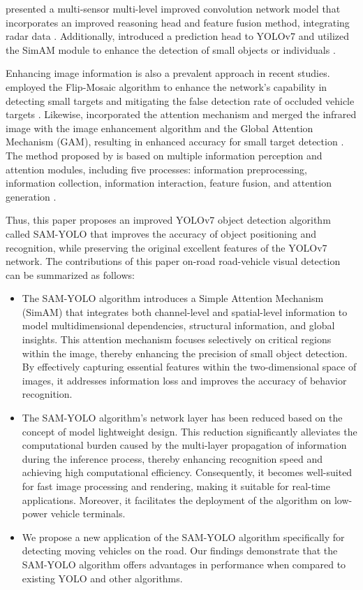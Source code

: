 \documentclass[aic]{iosart2x}
\begin{document}
\citeauthor{Zhu_2020} presented a multi-sensor multi-level improved convolution network model that incorporates an improved reasoning head and feature fusion method, integrating radar data \cite{Zhu_2020}. Additionally, \citeauthor{Zhao_2023} introduced a prediction head to YOLOv7 and utilized the SimAM module to enhance the detection of small objects or individuals \cite{Zhao_2023}.

Enhancing image information is also a prevalent approach in recent studies. \citeauthor{Liu_2022} employed the Flip-Mosaic algorithm to enhance the network's capability in detecting small targets and mitigating the false detection rate of occluded vehicle targets \cite{Liu_2022}. Likewise, \citeauthor{Jiang_2022_10} incorporated the attention mechanism and merged the infrared image with the image enhancement algorithm and the Global Attention Mechanism (GAM), resulting in enhanced accuracy for small target detection \citeauthor{Jiang_2022_10}. The method proposed by \citeauthor{Shen_2023} is based on multiple information perception and attention modules, including five processes: information preprocessing, information collection, information interaction, feature fusion, and attention generation \cite{Shen_2023}.

Thus, this paper proposes an improved YOLOv7 object detection algorithm called SAM-YOLO that improves the accuracy of object positioning and recognition, while preserving the original excellent features of the YOLOv7 network. The contributions of this paper on-road road-vehicle visual detection can be summarized as follows:

\begin{itemize}
    \item The SAM-YOLO algorithm introduces a Simple Attention Mechanism (SimAM) that integrates both channel-level and spatial-level information to model multidimensional dependencies, structural information, and global insights. This attention mechanism focuses selectively on critical regions within the image, thereby enhancing the precision of small object detection. By effectively capturing essential features within the two-dimensional space of images, it addresses information loss and improves the accuracy of behavior recognition.
          
    \item The SAM-YOLO algorithm's network layer has been reduced based on the concept of model lightweight design. This reduction significantly alleviates the computational burden caused by the multi-layer propagation of information during the inference process, thereby enhancing recognition speed and achieving high computational efficiency. Consequently, it becomes well-suited for fast image processing and rendering, making it suitable for real-time applications. Moreover, it facilitates the deployment of the algorithm on low-power vehicle terminals.
          
    \item We propose a new application of the SAM-YOLO algorithm specifically for detecting moving vehicles on the road. Our findings demonstrate that the SAM-YOLO algorithm offers advantages in performance when compared to existing YOLO and other algorithms.
\end{itemize}
\end{document}
